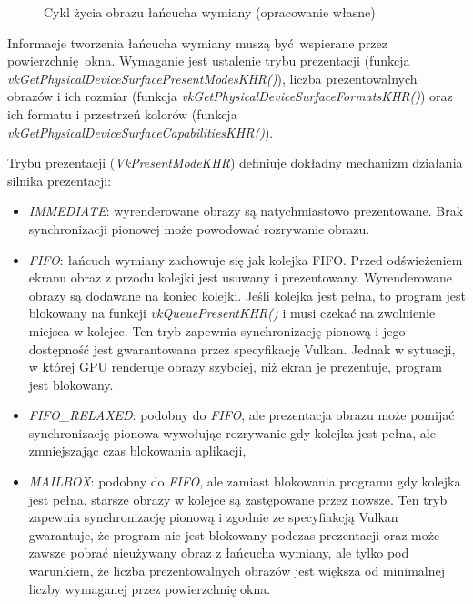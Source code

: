 \begin{figure}[H]
	\caption{Cykl życia obrazu łańcucha wymiany (opracowanie własne)}
	\label{swap_chain}
\end{figure}

Informacje tworzenia łańcucha wymiany muszą być wspierane przez powierzchnię okna.
Wymaganie jest ustalenie trybu prezentacji (funkcja \textit{vkGetPhysicalDeviceSurfacePresentModesKHR()}), liczba prezentowalnych obrazów i ich rozmiar (funkcja \textit{vkGetPhysicalDeviceSurfaceFormatsKHR()}) oraz ich formatu i przestrzeń kolorów (funkcja \textit{vkGetPhysicalDeviceSurfaceCapabilitiesKHR()}).

Trybu prezentacji (\textit{VkPresentModeKHR}) definiuje dokładny mechanizm działania silnika prezentacji:
\begin{itemize}
	\item \textit{IMMEDIATE}: wyrenderowane obrazy są natychmiastowo prezentowane. Brak synchronizacji pionowej może powodować rozrywanie obrazu.
	\item \textit{FIFO}: łańcuch wymiany zachowuje się jak kolejka FIFO. Przed odświeżeniem ekranu obraz z przodu kolejki jest usuwany i prezentowany. Wyrenderowane obrazy są dodawane na koniec kolejki. Jeśli kolejka jest pełna, to program jest blokowany na funkcji \textit{vkQueuePresentKHR()} i musi czekać na zwolnienie miejsca w kolejce. Ten tryb zapewnia synchronizację pionową i jego dostępność jest gwarantowana przez specyfikację Vulkan. Jednak w sytuacji, w której GPU renderuje obrazy szybciej, niż ekran je prezentuje, program jest blokowany.
	\item \textit{FIFO\_RELAXED}: podobny do \textit{FIFO}, ale prezentacja obrazu może pomijać synchronizację pionowa wywołując rozrywanie gdy kolejka jest pełna, ale zmniejszając czas blokowania aplikacji,
	\item \textit{MAILBOX}: podobny do \textit{FIFO}, ale zamiast blokowania programu gdy kolejka jest pełna, starsze obrazy w kolejce są zastępowane przez nowsze. Ten tryb zapewnia synchronizację pionową i zgodnie ze specyfiakcją Vulkan gwarantuje, że program nie jest blokowany podczas prezentacji oraz może zawsze pobrać nieużywany obraz z łańcucha wymiany, ale tylko pod warunkiem, że liczba prezentowalnych obrazów jest większa od minimalnej liczby wymaganej przez powierzchnię okna.
\end{itemize}

